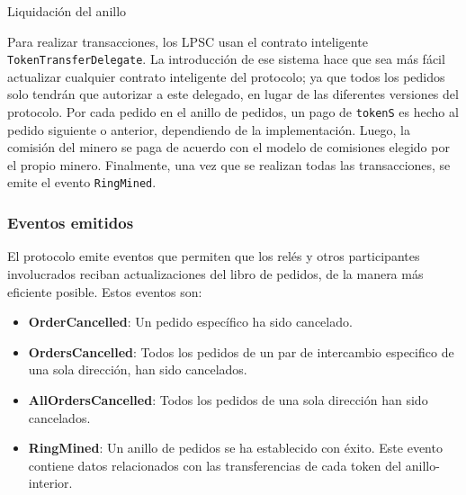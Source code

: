 \documentclass[UTF8,nofonts]{article}
\makeatletter
\newenvironment{figurehere}
 {\def\@captype{figure}}
 {}
\makeatother
\begin{document}
\begin{multicols}{2}
\begin{center}
\begin{figurehere}
\caption{Liquidaci\'on del anillo}
\label{fig:settlement}
\end{figurehere}
\end{center}

Para realizar transacciones, los LPSC usan el contrato inteligente \verb|TokenTransferDelegate|. La introducci\'on de ese sistema hace que sea m\'as f\'acil actualizar cualquier contrato inteligente del protocolo; ya que todos los pedidos solo tendr\'an que autorizar a este delegado, en lugar de las diferentes versiones del protocolo. Por cada pedido en el anillo de pedidos, un pago de \verb|tokenS| es hecho al pedido siguiente o anterior, dependiendo de la implementaci\'on. Luego, la comisi\'on del minero se paga de acuerdo con el modelo de comisiones elegido por el propio minero. Finalmente, una vez que se realizan todas las transacciones, se emite el evento \verb|RingMined|.


\subsubsection{Eventos emitidos\label{sec:events}}

El protocolo emite eventos que permiten que los rel\'es y otros participantes involucrados reciban actualizaciones del libro de pedidos, de la manera m\'as eficiente posible. Estos eventos son:

\begin{itemize}
	\item \textbf{OrderCancelled}: Un pedido espec\'ifico ha sido cancelado.
	\item \textbf{OrdersCancelled}: Todos los pedidos de un par de intercambio especifico de una sola direcci\'on, han sido cancelados.
	\item \textbf{AllOrdersCancelled}: Todos los pedidos de una sola direcci\'on han sido cancelados.
	\item \textbf{RingMined}: Un anillo de pedidos se ha establecido con \'exito. Este evento contiene datos relacionados con las transferencias de cada token del anillo-interior.
\end{itemize}


\end{multicols}
\end{document}
